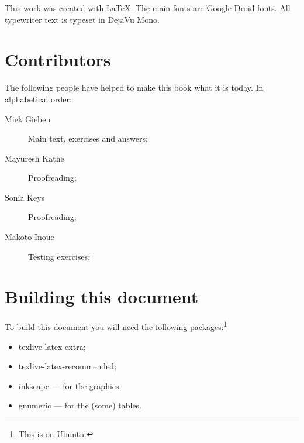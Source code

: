 This work was created with \LaTeX. The main fonts are Google Droid
fonts.
All typewriter text is typeset in DejaVu Mono.

\section{Contributors}
The following people have helped to make this book what it is today.
In alphabetical order:
\begin{description}
\item[Miek Gieben] 
{Main text, exercises and answers;}
\item[Mayuresh Kathe]
{Proofreading;}
\item[Sonia Keys]
{Proofreading;}
\item[Makoto Inoue]
{Testing exercises;}
\end{description}

\section{Building this document}
To build this document you will need the following packages:\footnote{This
is on Ubuntu.}
\begin{itemize}
\item{texlive-latex-extra;}
\item{texlive-latex-recommended;}
\item{inkscape --- for the graphics;}
\item{gnumeric --- for the (some) tables.}
\end{itemize}
